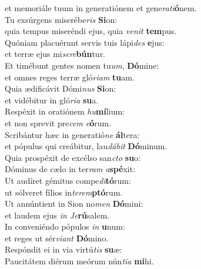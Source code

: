 \oddverse et memoriále tuum in generatiónem et gene\textit{ra}\textit{ti}\textbf{ó}nem.\\
\evenverse Tu exsúrgens miserébe\textit{ris} \textbf{Si}on:~\*\\
\evenverse quia tempus miseréndi ejus, quia \textit{ve}\textit{nit} \textbf{tem}pus.\\
\oddverse Quóniam placuérunt servis tuis lápi\textit{des} \textbf{e}jus:~\*\\
\oddverse et terræ ejus mi\textit{se}\textit{re}\textbf{bún}tur.\\
\evenverse Et timébunt gentes nomen tu\textit{um}, \textbf{Dó}mine:~\*\\
\evenverse et omnes reges terræ gló\textit{ri}\textit{am} \textbf{tu}am.\\
\oddverse Quia ædificávit Dómi\textit{nus} \textbf{Si}on:~\*\\
\oddverse et vidébitur in gló\textit{ri}\textit{a} \textbf{su}a.\\
\evenverse Respéxit in oratiónem \textit{hu}\textbf{mí}lium:~\*\\
\evenverse et non sprevit pre\textit{cem} \textit{e}\textbf{ó}rum.\\
\oddverse Scribántur hæc in generatió\textit{ne} \textbf{ál}tera:~\*\\
\oddverse et pópulus qui creábitur, lau\textit{dá}\textit{bit} \textbf{Dó}minum.\\
\evenverse Quia prospéxit de excélso san\textit{cto} \textbf{su}o:~\*\\
\evenverse Dóminus de cælo in ter\textit{ram} \textit{a}\textbf{spé}xit:\\
\oddverse Ut audíret gémitus compe\textit{di}\textbf{tó}rum:~\*\\
\oddverse ut sólveret fílios in\textit{te}\textit{rem}\textbf{ptó}rum.\\
\evenverse Ut annúntient in Sion no\textit{men} \textbf{Dó}mini:~\*\\
\evenverse et laudem ejus \textit{in} \textit{Je}\textbf{rú}salem.\\
\oddverse In conveniéndo pópulos \textit{in} \textbf{u}num:~\*\\
\oddverse et reges ut sér\textit{vi}\textit{ant} \textbf{Dó}mino.\\
\evenverse Respóndit ei in via virtú\textit{tis} \textbf{su}æ:~\*\\
\evenverse Paucitátem diérum meórum nún\textit{ti}\textit{a} \textbf{mi}hi.\\

